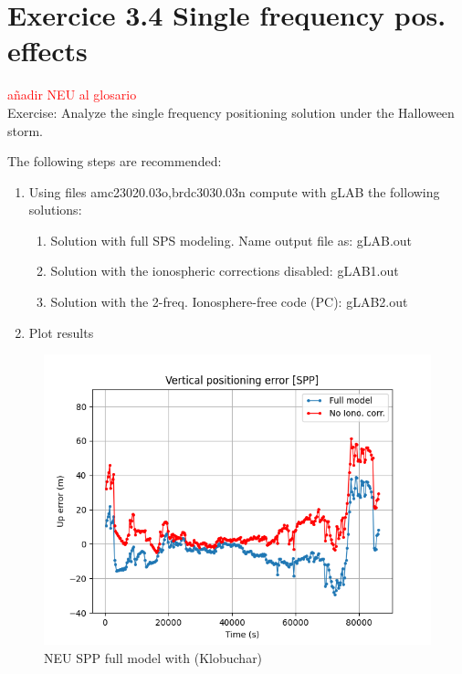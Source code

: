 \section{Exercice 3.4 Single frequency pos. effects}


\textcolor{red}{añadir NEU al glosario}\\
Exercise: Analyze the single frequency positioning solution under the Halloween storm.

The following steps are recommended:
\begin{enumerate}
\item Using files amc23020.03o,brdc3030.03n compute with gLAB the following solutions:
    \begin{enumerate}
        \item Solution with full SPS modeling. Name output file as: gLAB.out
        \item Solution with the ionospheric corrections disabled: gLAB1.out
        \item Solution with the 2-freq. Ionosphere-free code (PC): gLAB2.out
    \end{enumerate}
\item Plot results
\end{enumerate}

\begin{figure}[H]
        \centering
        \includegraphics[scale=0.52]{sources/Figures/FIG_2/TUT2_Ex3.4.2c.png}
        \caption{NEU SPP full model with (Klobuchar)}
        \label{fig:NEU SPP full model with (Klobuchar)}
\end{figure}


